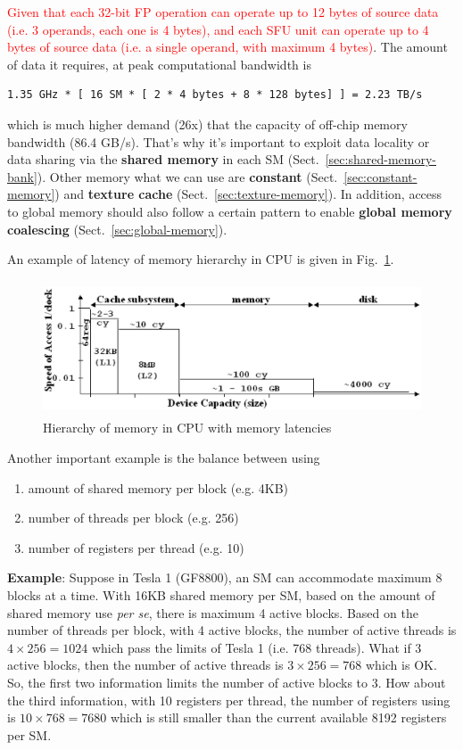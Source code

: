 \textcolor{red}{Given that each 32-bit FP operation can operate up to
  12 bytes of source data (i.e. 3 operands, each one is 4 bytes), and
  each SFU unit can operate up to 4 bytes of source data (i.e. a
  single operand, with maximum 4 bytes)}.
The amount of data it requires, at peak computational bandwidth is
\begin{verbatim}
1.35 GHz * [ 16 SM * [ 2 * 4 bytes + 8 * 128 bytes] ] = 2.23 TB/s
\end{verbatim}
which is much higher demand (26x) that the capacity of off-chip memory
bandwidth (86.4 GB/s). That's why it's important to exploit data
locality or data sharing via the {\bf shared memory} in each SM
(Sect.~\ref{sec:shared-memory-bank}). Other memory what we can use are
{\bf constant} (Sect.~\ref{sec:constant-memory}) and
{\bf texture cache} (Sect.~\ref{sec:texture-memory}). In addition,
access to global memory should also follow a certain pattern to enable
{\bf global memory coalescing} (Sect.~\ref{sec:global-memory}). 

An example of latency of memory hierarchy in CPU is given in
Fig.~\ref{fig:memory_latency}.

\begin{figure}[hbt]
  \centerline{\includegraphics[height=4cm,
    angle=0]{./images/memory_latency.eps}}
  \caption{Hierarchy of memory in CPU with memory latencies}
  \label{fig:memory_latency}
\end{figure}

Another important example is the balance between using
\begin{enumerate}
\item amount of shared memory per block (e.g. 4KB)
\item number of threads per block (e.g. 256)
\item number of registers per thread (e.g. 10)
\end{enumerate}

{\bf Example}: Suppose in Tesla 1 (GF8800), an SM can accommodate
maximum 8 blocks at a time. With 16KB shared memory per SM, based on
the amount of shared memory use {\it per se}, there is maximum 4
active blocks. Based on the number of threads per block, with 4 active
blocks, the number of active threads is $4\times 256 = 1024$ which
pass the limits of Tesla 1 (i.e. 768 threads). What if 3 active
blocks, then the number of active threads is $3\times 256 = 768$ which
is OK. So, the first two information limits the number of active
blocks to 3. How about the third information, with 10 registers per
thread, the number of registers using is $10\times 768=7680$ which is
still smaller than the current available 8192 registers per SM.


